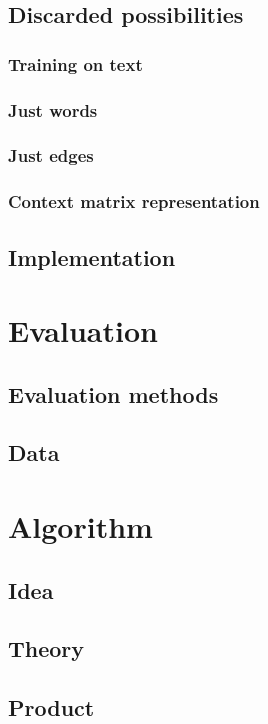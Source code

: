 \documentclass{article}
\begin{document}
 \subsection{Discarded possibilities} %
  \subsubsection{Training on text}
  \subsubsection{Just words}
  \subsubsection{Just edges}
  \subsubsection{Context matrix representation}
 \subsection{Implementation}
 
 
 \section{Evaluation}
 \subsection{Evaluation methods}
 
 \subsection{Data}
 
 \section{Algorithm}
 \subsection{Idea}
 \subsection{Theory}
 \subsection{Product}
 
\end{document}
